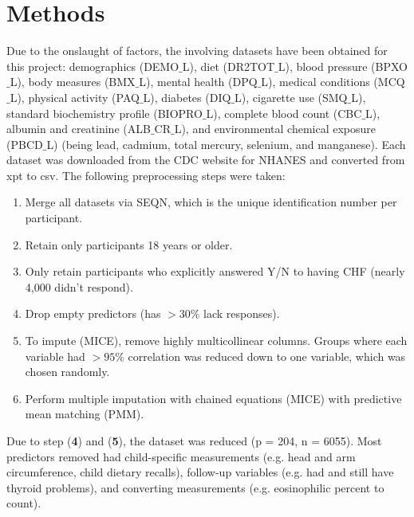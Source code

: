 \documentclass{article}
\begin{document}
\vspace{-6mm}
\section*{Methods}
\vspace{-6mm}

Due to the onslaught of factors, the involving datasets have been obtained for this project: demographics (DEMO$\_$L), diet (DR2TOT$\_$L), blood pressure (BPXO$\_$L), body measures (BMX$\_$L), mental health (DPQ$\_$L), medical conditions (MCQ$\_$L), physical activity (PAQ$\_$L), diabetes (DIQ$\_$L), cigarette use (SMQ$\_$L), standard biochemistry profile (BIOPRO$\_$L), complete blood count (CBC$\_$L), albumin and creatinine (ALB$\_$CR$\_$L), and environmental chemical exposure (PBCD$\_$L) (being lead, cadmium, total mercury, selenium, and manganese). Each dataset was downloaded from the CDC website for NHANES and converted from xpt to csv. The following preprocessing steps were taken:

\begin{enumerate}
	\item Merge all datasets via SEQN, which is the unique identification number per participant.
	\item Retain only participants 18 years or older.
	\item Only retain participants who explicitly answered Y/N to having CHF (nearly 4,000 didn't respond).
	\item Drop empty predictors (has $> 30\%$ lack responses).
	\item To impute (MICE), remove highly multicollinear columns. Groups where each variable had $>95\%$ correlation was reduced down to one variable, which was chosen randomly.
	\item Perform multiple imputation with chained equations (MICE) with predictive mean matching (PMM).
\end{enumerate}

Due to step (\textbf{4}) and (\textbf{5}), the dataset was reduced (p = 204, n = 6055). Most predictors removed had child-specific measurements (e.g. head and arm circumference, child dietary recalls), follow-up variables (e.g. had and still have thyroid problems), and converting measurements (e.g. eosinophilic percent to count). 

\end{document}
